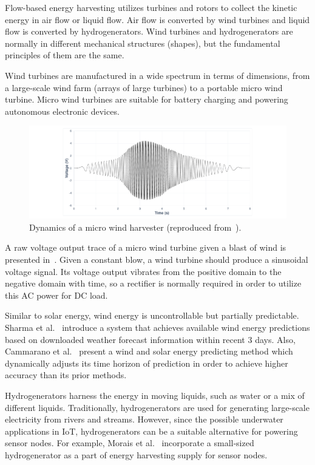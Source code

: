 Flow-based energy harvesting utilizes turbines and rotors to collect the kinetic energy in air flow or liquid flow. Air flow is converted by wind turbines and liquid flow is converted by hydrogenerators. Wind turbines and hydrogenerators are normally in different mechanical structures (shapes), but the fundamental principles of them are the same.

Wind turbines are manufactured in a wide spectrum in terms of dimensions, from a large-scale wind farm (arrays of large turbines) to a portable micro wind turbine. Micro wind turbines are suitable for battery charging and powering autonomous electronic devices. 

\begin{figure}[!htb]
    \centering
    \includegraphics[width=14cm]{ch2_review/figures/micro_wind_turbine}
    \caption{Dynamics of a micro wind harvester (reproduced from~\cite{balsamo2016graceful}).}
    \label{Figure:micro_wind_turbine}
\end{figure}

A raw voltage output trace of a micro wind turbine given a blast of wind is presented in~. Given a constant blow, a wind turbine should produce a sinusoidal voltage signal. Its voltage output vibrates from the positive domain to the negative domain with time, so a rectifier is normally required in order to utilize this AC power for DC load.

Similar to solar energy, wind energy is uncontrollable but partially predictable. Sharma et al.~\cite{sharma2010cloudy} introduce a system that achieves available wind energy predictions based on downloaded weather forecast information within recent 3 days. Also, Cammarano et al.~\cite{cammarano2012pro} present a wind and solar energy predicting method which dynamically adjusts its time horizon of prediction in order to achieve higher accuracy than its prior methods. 

Hydrogenerators harness the energy in moving liquids, such as water or a mix of different liquids. Traditionally, hydrogenerators are used for generating large-scale electricity from rivers and streams. However, since the possible underwater applications in IoT, hydrogenerators can be a suitable alternative for powering sensor nodes. For example, Morais et al.~\cite{morais2008sun} incorporate a small-sized hydrogenerator as a part of energy harvesting supply for sensor nodes. 

